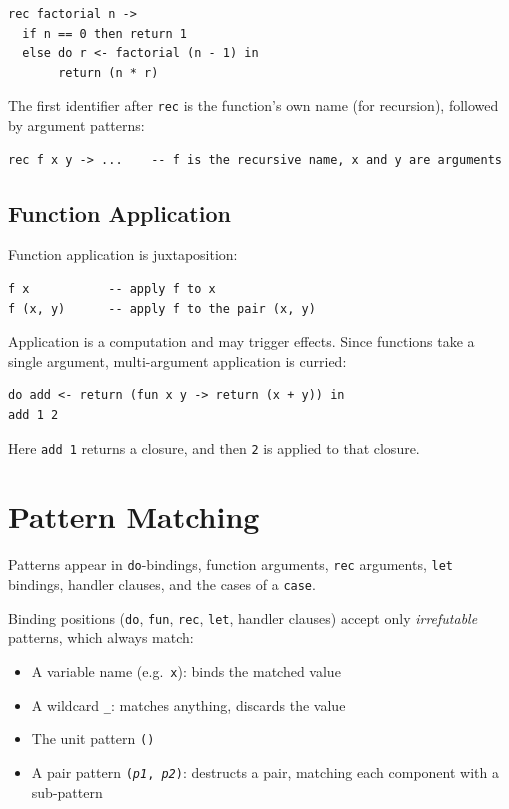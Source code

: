 \documentclass[11pt,a4paper]{article}
\newcommand{\cba}[1]{\lstinline[style=cbainline]{#1}}
\begin{document}
\begin{lstlisting}
rec factorial n ->
  if n == 0 then return 1
  else do r <- factorial (n - 1) in
       return (n * r)
\end{lstlisting}

The first identifier after \cba{rec} is the function's own name (for
recursion), followed by argument patterns:

\begin{lstlisting}
rec f x y -> ...    -- f is the recursive name, x and y are arguments
\end{lstlisting}

\subsection{Function Application}

Function application is juxtaposition:

\begin{lstlisting}
f x           -- apply f to x
f (x, y)      -- apply f to the pair (x, y)
\end{lstlisting}

Application is a computation and may trigger effects.  Since functions take
a single argument, multi-argument application is curried:

\begin{lstlisting}
do add <- return (fun x y -> return (x + y)) in
add 1 2
\end{lstlisting}

Here \cba{add 1} returns a closure, and then \texttt{2} is applied to that
closure.

\section{Pattern Matching}
\label{sec:patterns}

Patterns appear in \cba{do}-bindings, function arguments, \cba{rec} arguments,
\cba{let} bindings, handler clauses, and the cases of a \cba{case}.

Binding positions (\cba{do}, \cba{fun}, \cba{rec}, \cba{let}, handler
clauses) accept only \emph{irrefutable} patterns, which always match:

\begin{itemize}
  \item A variable name (e.g.\ \texttt{x}): binds the matched value
  \item A wildcard \cba{_}: matches anything, discards the value
  \item The unit pattern \cba{()}
  \item A pair pattern \texttt{(\emph{p1}, \emph{p2})}: destructs a pair,
        matching each component with a sub-pattern
\end{itemize}
\end{document}
